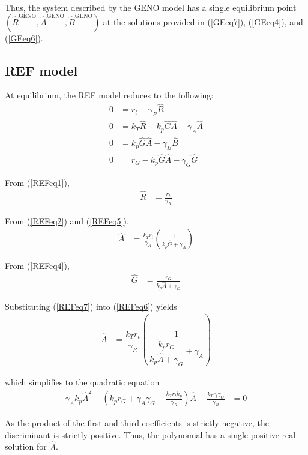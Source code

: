 \documentclass[12pt]{article}
\numberwithin{equation}{section}
\begin{document}
\noindent Thus, the system described by the GENO model has a single equilibrium point $(\hat{R}^{\mathrm{GENO}}, \hat{A}^{\mathrm{GENO}}, \hat{B}^{\mathrm{GENO}})$ at the solutions provided in (\ref{GEeq7}), (\ref{GEeq4}), and (\ref{GEeq6}).

\subsection{REF model}

\noindent At equilibrium, the REF model reduces to the following:
\begin{align}
  0 &= r_t - \gamma_R \hat{R} \label{REFeq1}\\
  0 &= k_T \hat{R} - k_p \hat{G} \hat{A} - \gamma_A \hat{A} \label{REFeq2}\\
  0 &= k_p \hat{G} \hat{A} - \gamma_B \hat{B} \label{REFeq3}\\
  0 &= r_G - k_p \hat{G} \hat{A} - \gamma_G \hat{G} \label{REFeq4}
\end{align}

\noindent From (\ref{REFeq1}),
\begin{align}
  \hat{R} &= \frac{r_t}{\gamma_R} \label{REFeq5}
\end{align}

\noindent From (\ref{REFeq2}) and (\ref{REFeq5}),
\begin{align}
  \hat{A} &= \frac{k_T r_t}{\gamma_R} \left( \frac{1}{k_p \hat{G} + \gamma_A} \right) \label{REFeq6}
\end{align}

\noindent From (\ref{REFeq4}),
\begin{align}
  \hat{G} &= \frac{r_G}{k_p \hat{A} + \gamma_G} \label{REFeq7}
\end{align}

\noindent Substituting (\ref{REFeq7}) into (\ref{REFeq6}) yields
\begin{align}
  \hat{A} &= \dfrac{k_T r_t}{\gamma_R} \left( \dfrac{1}{\dfrac{k_p r_G}{k_p \hat{A} + \gamma_G} + \gamma_A} \right)
\end{align}

\noindent which simplifies to the quadratic equation
\begin{align}
  \gamma_A k_p \hat{A}^2 + \left( k_p r_G + \gamma_A \gamma_G - \frac{k_T r_t k_p}{\gamma_R} \right) \hat{A} - \frac{k_T r_t \gamma_G}{\gamma_R} &= 0 \label{REFeq9}
\end{align}

\noindent As the product of the first and third coefficients is strictly negative, the discriminant is strictly positive. Thus, the polynomial has a single positive real solution for $\hat{A}$.\\
\end{document}
